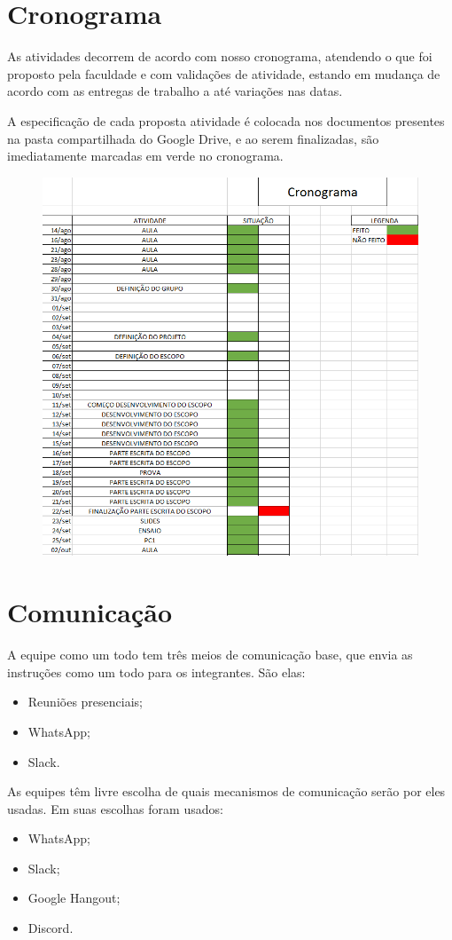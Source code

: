 \section{Cronograma}
\par As atividades decorrem de acordo com nosso cronograma, atendendo o que foi proposto pela faculdade  e com validações de atividade, estando em mudança de acordo com as entregas de trabalho a até variações nas datas.
\par A especificação de cada proposta atividade é colocada nos documentos presentes na pasta compartilhada do Google Drive, e ao serem finalizadas, são imediatamente marcadas em verde no cronograma.

\begin{figure}[ht]
\includegraphics[width=\textwidth]{figuras/cronograma}
\end{figure}

\newpage

\section{Comunicação}
\par A equipe como um todo tem três meios de comunicação base, que envia as instruções como um todo para os integrantes. São elas:
\begin{itemize}
    \item Reuniões presenciais;
    \item WhatsApp;
    \item Slack.
\end{itemize}
\par As equipes têm livre escolha de quais mecanismos de comunicação serão por eles usadas. Em suas escolhas foram usados:
\begin{itemize}
    \item WhatsApp;
    \item Slack;
    \item Google Hangout;
    \item Discord.
\end{itemize}
